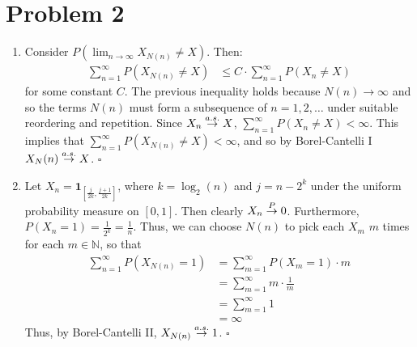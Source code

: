 \documentclass{article}
\begin{document}
\section*{Problem 2}
\begin{enumerate}[label=(\alph*)]
\item Consider $P(\lim_{n\to\infty} X_{N(n)} \neq X)$. Then:
\begin{align*}
    \sum_{n=1}^\infty P(X_{N(n)} \neq X) &\leq C \cdot \sum_{n=1}^\infty P(X_n \neq X)
\end{align*}
for some constant $C$. The previous inequality holds because $N(n) \to \infty$ and so the terms $N(n)$ must form a subsequence of $n = 1,2,\ldots$ under suitable reordering and repetition. Since $X_n \overset{a.s.}{\to} X$, $\sum_{n=1}^\infty P(X_n \neq X) < \infty$. This implies that $\sum_{n=1}^\infty P(X_{N(n)} \neq X) < \infty$, and so by Borel-Cantelli I $X_N(n) \overset{a.s.}{\to} X$. $\square$

\item Let $X_n = \mathbf{1}_{[\frac{j}{2k},\frac{j+1}{2k}]}$, where $k = \log_2(n)$ and $j = n - 2^k$ under the uniform probability measure on $[0,1]$. Then clearly $X_n \overset{P}{\to} 0$. Furthermore, $P(X_n = 1) = \frac{1}{2^k} = \frac{1}{n}$. Thus, we can choose $N(n)$ to pick each $X_m$ $m$ times for each $m \in \mathbb{N}$, so that 
\begin{align*}
    \sum_{n=1}^\infty P(X_{N(n)} = 1) &= \sum_{m=1}^\infty P(X_m = 1) \cdot m\\
    &= \sum_{m=1}^\infty m \cdot \frac{1}{m} \\
    &= \sum_{m=1}^\infty 1 \\
    &= \infty
\end{align*}
Thus, by Borel-Cantelli II, $X_{N(n)} \overset{a.s.}{\to} 1$. $\square$
\end{enumerate}
\end{document}
